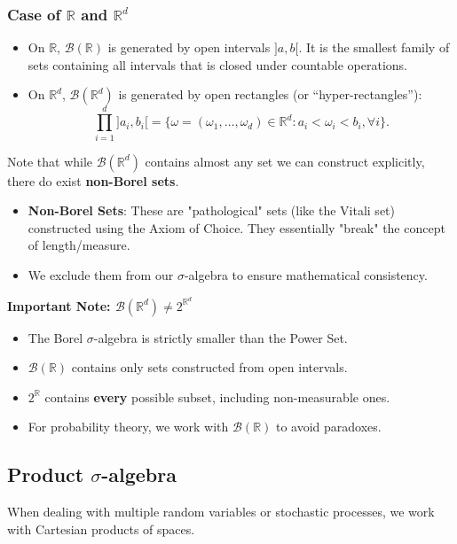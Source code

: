 \subsubsection{Case of $\mathbb{R}$ and $\mathbb{R}^d$}
\begin{itemize}
    \item On $\mathbb{R}$, $\mathcal{B}(\mathbb{R})$ is generated by open intervals $]a, b[$. It is the smallest family of sets containing all intervals that is closed under countable operations.
    \item On $\mathbb{R}^d$, $\mathcal{B}(\mathbb{R}^d)$ is generated by open rectangles (or ``hyper-rectangles''):
    \[
    \prod_{i=1}^d ]a_i, b_i[ = \{ \omega = (\omega_1, \dots, \omega_d) \in \mathbb{R}^d : a_i < \omega_i < b_i, \forall i \}.
    \]
\end{itemize}
Note that while $\mathcal{B}(\mathbb{R}^d)$ contains almost any set we can construct explicitly, there do exist \textbf{non-Borel sets}.
    \begin{itemize}
        \item \textbf{Non-Borel Sets}: These are "pathological" sets (like the Vitali set) constructed using the Axiom of Choice. They essentially "break" the concept of length/measure.
        \item We exclude them from our $\sigma$-algebra to ensure mathematical consistency.
    \end{itemize}

    \textbf{Important Note: $\mathcal{B}(\mathbb{R}^d) \neq 2^{\mathbb{R}^d}$}
    \begin{itemize}
        \item The Borel $\sigma$-algebra is strictly smaller than the Power Set.
        \item $\mathcal{B}(\mathbb{R})$ contains only sets constructed from open intervals.
        \item $2^{\mathbb{R}}$ contains \textbf{every} possible subset, including non-measurable ones.
        \item For probability theory, we work with $\mathcal{B}(\mathbb{R})$ to avoid paradoxes.
    \end{itemize}

\subsection{Product \texorpdfstring{$\sigma$-}{sigma-}algebra}
When dealing with multiple random variables or stochastic processes, we work with Cartesian products of spaces.

